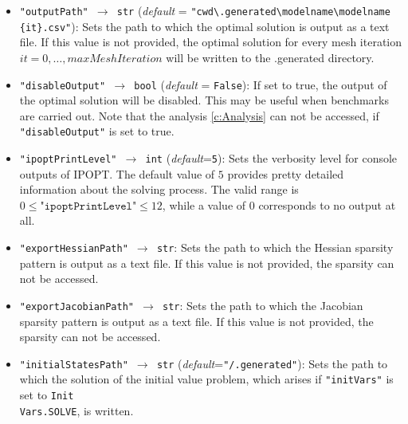 \documentclass[12pt]{article}
\begin{document}
\begin{mdframed}[backgroundcolor=gray!10, roundcorner=10pt,
		linewidth=1pt]
\begin{itemize}
			
			\label{flag:outputPath}
			\item \texttt{"outputPath" $\rightarrow$ str} (\emph{default} = \texttt{"cwd\textbackslash .generated\textbackslash modelname\textbackslash modelname\\\{it\}.csv"}): Sets the path to
			which the optimal solution is output as a text file. If this
			value is not provided,
			the optimal solution for every mesh iteration $it=0, \ldots,
			maxMeshIteration$ will be written to the .generated directory.
			
			\label{flag:disableOutput}
			\item \texttt{"disableOutput" $\rightarrow$ bool} (\emph{default} = \texttt{False}): If set to true, the output of the optimal solution will be disabled. This may be useful when benchmarks are carried out.
			Note that the analysis \eqref{c:Analysis} can not be accessed, if \texttt{"disableOutput"} is set to true.

		      \label{flag:ipoptPrintLevel}
		\item \texttt{"ipoptPrintLevel" $\rightarrow$ int}
		      (\emph{default}=\texttt{5}): Sets the verbosity level for
		      console outputs of IPOPT. The default value of $5$ provides pretty detailed
		      information about the solving process. The valid range is $0 \leq
			      \texttt{"ipoptPrintLevel"} \leq 12$, while a value of $0$ corresponds to no
		      output at all.

		      \label{flag:exportHessianPath}
		\item \texttt{"exportHessianPath" $\rightarrow$ str}: Sets the
		      path to
		      which the Hessian sparsity pattern is output as a text
		      file. If this value is
		      not provided, the sparsity can not be accessed.

		      \label{flag:exportJacobianPath}
		\item \texttt{"exportJacobianPath" $\rightarrow$ str}: Sets the
		      path to
		      which the Jacobian sparsity pattern is output as a text
		      file. If this value is
		      not provided, the sparsity can not be accessed.

		      \label{flag:initialStatesPath}
		\item \texttt{"initialStatesPath" $\rightarrow$ str}
		      (\emph{default}=\texttt{"/.generated"}): Sets the path to
		      which the solution of
		      the initial value problem, which arises if
		      \texttt{"initVars"} is set to
		      \texttt{Init\\Vars.SOLVE}, is written.
		      

\end{itemize}
\end{mdframed}
\end{document}
